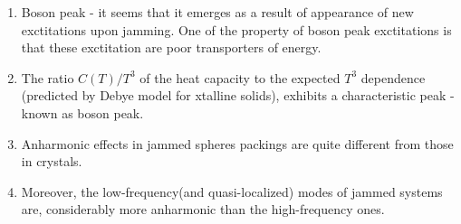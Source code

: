 \documentclass[10pt,a4paper]{article}
\begin{document}
\begin{enumerate}
\begin{itemize}
 \end{itemize}
 \item  Boson peak - it seems that it emerges as a result of appearance of new exctitations upon jamming.
 One of the property of boson peak exctitations is that these exctitation are poor transporters of energy.
 \item The ratio $C(T)/T^3$ of the heat capacity to the expected $T^3$ dependence (predicted by Debye model for xtalline solids), 
 exhibits a characteristic peak - known as boson peak.
 \item Anharmonic effects in jammed spheres packings are quite different from those in crystals. 
 \item Moreover, the low-frequency(and quasi-localized) modes of jammed systems are, considerably more anharmonic than the high-frequency ones. 
\end{enumerate}
\end{document}

